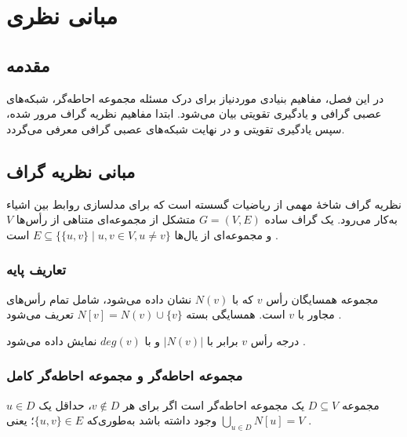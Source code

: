 \chapter{مبانی نظری}
\label{ch:theory}

\section{مقدمه}

در این فصل، مفاهیم بنیادی موردنیاز برای درک مسئله مجموعه احاطه‌گر، شبکه‌های عصبی گرافی و یادگیری تقویتی بیان می‌شود. ابتدا مفاهیم نظریه گراف مرور شده، سپس یادگیری تقویتی و در نهایت شبکه‌های عصبی گرافی معرفی می‌گردد.

\section{مبانی نظریه گراف}

نظریه گراف شاخۀ مهمی از ریاضیات گسسته است که برای مدلسازی روابط بین اشیاء به‌کار می‌رود. یک گراف ساده $G=(V,E)$ متشکل از مجموعه‌ای متناهی از رأس‌ها $V$ و مجموعه‌ای از یال‌ها $E \subseteq \{\{u,v\} \mid u,v \in V, u \neq v\}$ است \cite{bondy2008}.

\subsection{تعاریف پایه}

\begin{definition}[همسایگی]
مجموعه همسایگان رأس $v$ که با $N(v)$ نشان داده می‌شود، شامل تمام رأس‌های مجاور با $v$ است. همسایگی بسته $N[v]=N(v)\cup\{v\}$ تعریف می‌شود \cite{bondy2008}.
\end{definition}

\begin{definition}
درجه رأس $v$ برابر با $|N(v)|$ و با $deg(v)$ نمایش داده می‌شود \cite{bondy2008}.
\end{definition}

\subsection{مجموعه احاطه‌گر و مجموعه احاطه‌گر کامل}

\begin{definition}
مجموعه $D \subseteq V$ یک مجموعه احاطه‌گر است اگر برای هر $v \notin D$، حداقل یک $u \in D$ وجود داشته باشد به‌طوری‌که $\{u,v\} \in E$؛ یعنی $\bigcup_{u\in D} N[u] = V$ \cite{haynes1998fundamentals}.
\end{definition}

